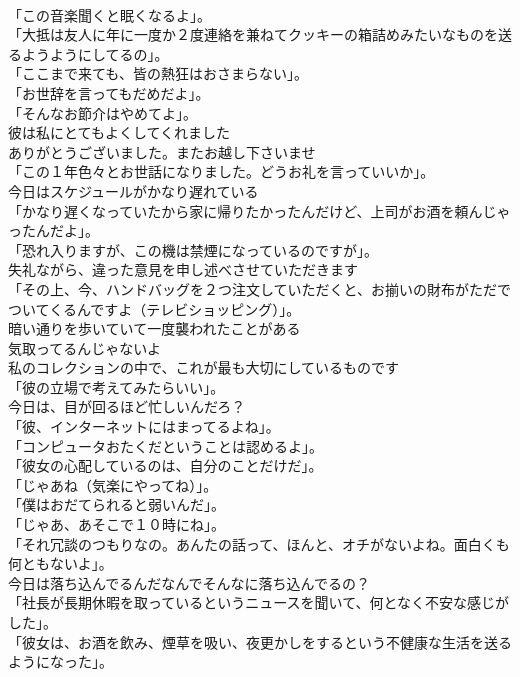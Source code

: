 \documentclass[8pt]{extreport}
\begin{document}
\begin{CJK}{UTF8}{min}
\\	「この音楽聞くと眠くなるよ」。	
\\	「大抵は友人に年に一度か２度連絡を兼ねてクッキーの箱詰めみたいなものを送るようようにしてるの」。	
\\	「ここまで来ても、皆の熱狂はおさまらない」。	
\\	「お世辞を言ってもだめだよ」。	
\\	「そんなお節介はやめてよ」。	
\\	彼は私にとてもよくしてくれました	
\\	ありがとうございました。またお越し下さいませ	
\\	「この１年色々とお世話になりました。どうお礼を言っていいか」。	
\\	今日はスケジュールがかなり遅れている	
\\	「かなり遅くなっていたから家に帰りたかったんだけど、上司がお酒を頼んじゃったんだよ」。	
\\	「恐れ入りますが、この機は禁煙になっているのですが」。	
\\	失礼ながら、違った意見を申し述べさせていただきます	
\\	「その上、今、ハンドバッグを２つ注文していただくと、お揃いの財布がただでついてくるんですよ（テレビショッピング）」。	
\\	暗い通りを歩いていて一度襲われたことがある	
\\	気取ってるんじゃないよ	
\\	私のコレクションの中で、これが最も大切にしているものです	
\\	「彼の立場で考えてみたらいい」。	
\\	今日は、目が回るほど忙しいんだろ？	
\\	「彼、インターネットにはまってるよね」。	
\\	「コンピュータおたくだということは認めるよ」。	
\\	「彼女の心配しているのは、自分のことだけだ」。	
\\	「じゃあね（気楽にやってね）」。	
\\	「僕はおだてられると弱いんだ」。	
\\	「じゃあ、あそこで１０時にね」。	
\\	「それ冗談のつもりなの。あんたの話って、ほんと、オチがないよね。面白くも何ともないよ」。	
\\	今日は落ち込んでるんだなんでそんなに落ち込んでるの？	
\\	「社長が長期休暇を取っているというニュースを聞いて、何となく不安な感じがした」。	
\\	「彼女は、お酒を飲み、煙草を吸い、夜更かしをするという不健康な生活を送るようになった」。	

\end{CJK}
\end{document}
